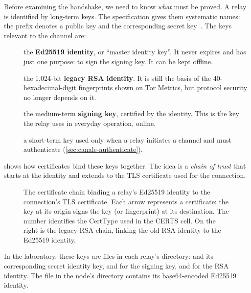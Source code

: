 Before examining the handshake, we need to know \emph{what} must be proved. A relay is identified by long-term keys. The specification gives them systematic names: the  prefix denotes a public key and  the corresponding secret key~. The keys relevant to the channel are:

\begin{description}
  \item[] the \textbf{Ed25519 identity}, or \enquote{master identity key}. It never expires and has just one purpose: to sign the signing key. It can be kept offline.
  \item[] the 1,024-bit \textbf{legacy RSA identity}. It is still the basis of the 40-hexadecimal-digit fingerprints shown on Tor Metrics, but protocol security no longer depends on it.
  \item[] the medium-term \textbf{signing key}, certified by the identity. This is the key the relay uses in everyday operation, online.
  \item[] a short-term key used only when a relay initiates a channel and must authenticate (\cref{sec:canale-authenticate}).
\end{description}

 shows how certificates bind these keys together. The idea is a \emph{chain of trust} that starts at the identity and extends to the TLS certificate used for the connection.

\begin{figure}[htbp]
\centering

\caption{The certificate chain binding a relay's Ed25519 identity to the connection's TLS certificate. Each arrow represents a certificate: the key at its origin signs the key (or fingerprint) at its destination. The number identifies the CertType used in the CERTS cell. On the right is the legacy RSA chain, linking the old RSA identity to the Ed25519 identity.}
\label{fig:chiavi-relay}
\end{figure}

In the laboratory, these keys are files in each relay's  directory:  and its corresponding secret identity key,  and  for the signing key, and  for the RSA identity. The  file in the node's directory contains its base64-encoded Ed25519 identity.

